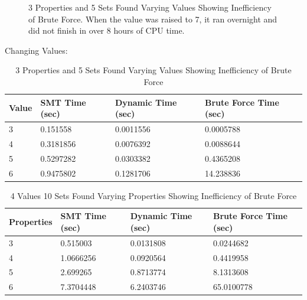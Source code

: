 \documentclass[pageno]{jpaper}
\begin{document}
\begin{figure}[htbb]
\begin{minipage}[b]{0.5\linewidth}
\caption{3 Properties and 5 Sets Found Varying Values Showing Inefficiency of Brute Force. When the value was raised to 7, it ran overnight and did not finish in over 8 hours of CPU time.}
\label{fig:bruteSet}
\end{minipage}
\end{figure}







Changing Values:

\begin{table}[hbt]
  \centering
  \begin{tabular}{|l   |l   |l |l | } \hline
    \textbf{Value} & \textbf{SMT Time (sec)}  & \textbf{Dynamic Time (sec)} & \textbf{Brute Force Time (sec)} \\\hline
    3          &   0.151558  &  0.0011556 & 0.0005788 \\ \hline 
    4          &   0.3181856 &  0.0076392 &  0.0088644 \\ \hline 
    5          &   0.5297282 &  0.0303382 &  0.4365208\\ \hline 
    6        &   0.9475802 &  0.1281706  & 14.238836 \\ \hline 
  \end{tabular}
  \caption{3 Properties and 5 Sets Found Varying Values Showing Inefficiency of Brute Force}
  \label{table:data}
\end{table}






\begin{table}[hbt]
  \centering
  \begin{tabular}{|l   |l   |l |l | } \hline
    \textbf{Properties} & \textbf{SMT Time (sec)}  & \textbf{Dynamic Time (sec)} & \textbf{Brute Force Time (sec)} \\\hline
    3          &   0.515003  &  0.0131808 & 0.0244682 \\ \hline 
    4          &   1.0666256 &  0.0920564 &  0.4419958 \\ \hline 
    5          &   2.699265 &  0.8713774 &  8.1313608\\ \hline 
    6        &   7.3704448 &  6.2403746  & 65.0100778 \\ \hline 
  \end{tabular}
  \caption{4 Values 10 Sets Found Varying Properties Showing Inefficiency of Brute Force}
  \label{table:data}
\end{table}
\end{document}
